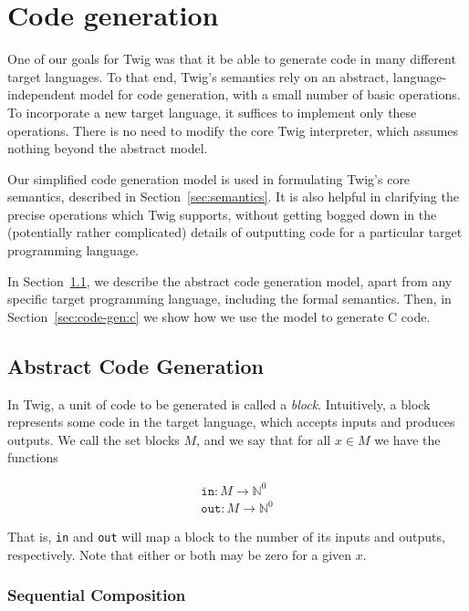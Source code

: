 
\section{Code generation}
\label{sec:code-gen}

One of our goals for Twig was that it be able to generate code in many different target languages. To that end, Twig's semantics rely on an abstract, language-independent model for code generation, with a small number of basic operations. To incorporate a new target language, it suffices to implement only these operations. There is no need to modify the core Twig interpreter, which assumes nothing beyond the abstract model.

Our simplified code generation model is used in formulating Twig's core semantics, described in Section~\ref{sec:semantics}. It is also helpful in clarifying the precise operations which Twig supports, without getting bogged down in the (potentially rather complicated) details of outputting code for a particular target programming language.

In Section~\ref{sec:code-gen:abstract}, we describe the abstract code generation model, apart from any specific target programming language, including the formal semantics. Then, in Section~\ref{sec:code-gen:c} we show how we use the model to generate C code.

\subsection{Abstract Code Generation}
\label{sec:code-gen:abstract}

In Twig, a unit of code to be generated is called a \emph{block}. Intuitively, a block represents some code in the target language, which accepts inputs and produces outputs. We call the set blocks $M$, and we say that for all $x \in M$ we have the functions 

\begin{eqnarray*}
\mathtt{in} : M \to \mathbb{N}^0\\
\mathtt{out} : M \to \mathbb{N}^0
\end{eqnarray*}

That is, \texttt{in} and \texttt{out} will map a block to the  number of its inputs and outputs, respectively. Note that either or both may be zero for a given $x$.

\subsubsection{Sequential Composition}

